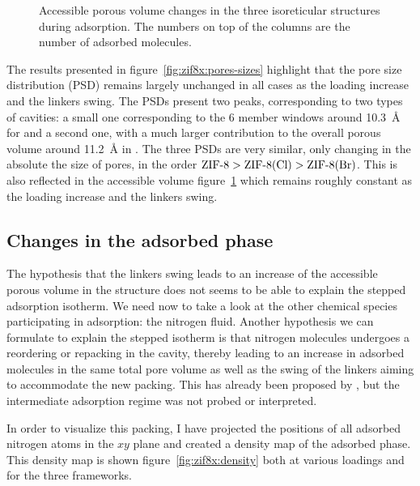 \documentclass[thesis]{subfiles}
\begin{document}

\begin{figure}[ht]
    \centering
    
    \caption{Accessible porous volume changes in the three isoreticular
    structures during adsorption. The numbers on top of the columns are the
    number of adsorbed  molecules.}
    \label{fig:zif8x:porous-volume}
\end{figure}

The results presented in figure~\ref{fig:zif8x:pores-sizes} highlight that the
pore size distribution (PSD) remains largely unchanged in all cases as the
loading increase and the linkers swing. The PSDs present two peaks,
corresponding to two types of cavities: a small one corresponding to the 6
member windows around \SI{10.3}{\AA} for  and a second one, with a much
larger contribution to the overall porous volume around \SI{11.2}{\AA} in .
The three PSDs are very similar, only changing in the absolute the size of
pores, in the order $\text{\ZIF8} > \text{\ZIFCl} > \text{\ZIFBr}$. This is also
reflected in the accessible volume figure~\ref{fig:zif8x:porous-volume} which
remains roughly constant as the loading increase and the linkers swing.

\subsection{Changes in the adsorbed phase}

The hypothesis that the linkers swing leads to an increase of the accessible
porous volume in the structure does not seems to be able to explain the stepped
adsorption isotherm. We need now to take a look at the other chemical species
participating in adsorption: the nitrogen fluid. Another hypothesis we can
formulate to explain the stepped isotherm is that nitrogen molecules undergoes a
reordering or repacking in the cavity, thereby leading to an increase in
adsorbed molecules in the same total pore volume as well as the swing of the
linkers aiming to accommodate the new packing. This has already been proposed by
\citeauthor{Ania2012}\cite{Ania2012}, but the intermediate adsorption regime was
not probed or interpreted.

In order to visualize this packing, I have projected the positions of all
adsorbed nitrogen atoms in the $xy$ plane and created a density map of the
adsorbed phase. This density map is shown figure~\ref{fig:zif8x:density} both at
various loadings and for the three frameworks.
\end{document}

